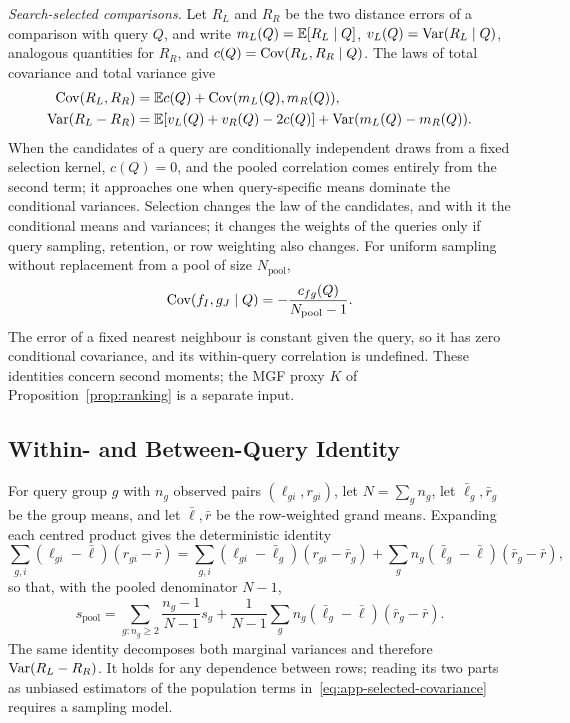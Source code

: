 \noindent\emph{Search-selected comparisons.}\quad
Let $R_L$ and $R_R$ be the two distance errors of a comparison with query $Q$, and write $m_L(Q)=\mathbb{E}[R_L\mid Q]$, $v_L(Q)=\operatorname{Var}(R_L\mid Q)$, analogous quantities for $R_R$, and $c(Q)=\operatorname{Cov}(R_L,R_R\mid Q)$. The laws of total covariance and total variance give
\begin{align}
\operatorname{Cov}(R_L,R_R)&=\mathbb{E} c(Q)+\operatorname{Cov}(m_L(Q),m_R(Q)),\\
\operatorname{Var}(R_L-R_R)&=\mathbb{E}[v_L(Q)+v_R(Q)-2c(Q)]+\operatorname{Var}(m_L(Q)-m_R(Q)).
\label{eq:app-selected-covariance}
\end{align}
When the candidates of a query are conditionally independent draws from a fixed selection kernel, $c(Q)=0$, and the pooled correlation comes entirely from the second term; it approaches one when query-specific means dominate the conditional variances. Selection changes the law of the candidates, and with it the conditional means and variances; it changes the weights of the queries only if query sampling, retention, or row weighting also changes. For uniform sampling without replacement from a pool of size $N_{\mathrm{pool}}$,
\begin{equation}
\operatorname{Cov}(f_I,g_J\mid Q)=-\frac{c_{fg}(Q)}{N_{\mathrm{pool}}-1}.
\end{equation}
The error of a fixed nearest neighbour is constant given the query, so it has zero conditional covariance, and its within-query correlation is undefined. These identities concern second moments; the MGF proxy $K$ of Proposition~\ref{prop:ranking} is a separate input.

\subsection{Within- and Between-Query Identity}
\label{app:within-between}

For query group $g$ with $n_g$ observed pairs $(\ell_{gi},r_{gi})$, let $N=\sum_gn_g$, let $\bar\ell_g,\bar r_g$ be the group means, and let $\bar\ell,\bar r$ be the row-weighted grand means. Expanding each centred product gives the deterministic identity
\begin{equation}
\sum_{g,i}(\ell_{gi}-\bar\ell)(r_{gi}-\bar r)
=\sum_{g,i}(\ell_{gi}-\bar\ell_g)(r_{gi}-\bar r_g)
+\sum_gn_g(\bar\ell_g-\bar\ell)(\bar r_g-\bar r),
\label{eq:app-anova-covariance}
\end{equation}
so that, with the pooled denominator $N-1$,
\begin{equation}
s_{\mathrm{pool}}=\sum_{g:n_g\ge2}\frac{n_g-1}{N-1}s_g+\frac1{N-1}\sum_gn_g(\bar\ell_g-\bar\ell)(\bar r_g-\bar r).
\end{equation}
The same identity decomposes both marginal variances and therefore $\operatorname{Var}(R_L-R_R)$. It holds for any dependence between rows; reading its two parts as unbiased estimators of the population terms in~\eqref{eq:app-selected-covariance} requires a sampling model.

